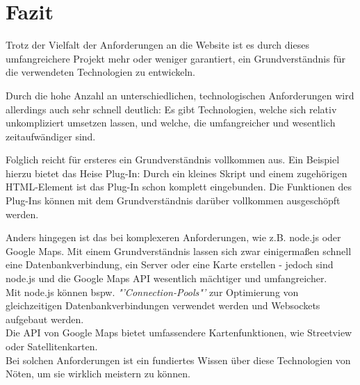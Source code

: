 \chapter{Fazit}
\label{Fazit}
Trotz der Vielfalt der Anforderungen an die Website ist es durch dieses umfangreichere Projekt mehr oder weniger garantiert, ein Grundverständnis für die verwendeten Technologien zu entwickeln. 
\par
Durch die hohe Anzahl an unterschiedlichen, technologischen Anforderungen wird allerdings auch sehr schnell deutlich: Es gibt Technologien, welche sich relativ unkompliziert umsetzen lassen, und welche, die umfangreicher und wesentlich zeitaufwändiger sind. 
\par
Folglich reicht für ersteres ein Grundverständnis vollkommen aus. Ein Beispiel hierzu bietet das Heise Plug-In: Durch ein kleines Skript und einem zugehörigen HTML-Element ist das Plug-In schon komplett eingebunden. Die Funktionen des Plug-Ins können mit dem Grundverständnis darüber vollkommen ausgeschöpft werden.
\par
Anders hingegen ist das bei komplexeren Anforderungen, wie z.B. node.js oder Google Maps. Mit einem Grundverständnis lassen sich zwar einigermaßen schnell eine Datenbankverbindung, ein Server oder eine Karte erstellen - jedoch sind node.js und die Google Maps API wesentlich mächtiger und umfangreicher. 
\\
Mit node.js können bspw. \textit{"'Connection-Pools"'} zur Optimierung von gleichzeitigen Datenbankverbindungen verwendet werden und Websockets aufgebaut werden. 
\\
Die API von Google Maps bietet umfassendere Kartenfunktionen, wie Streetview oder Satellitenkarten.
\\
Bei solchen Anforderungen ist ein fundiertes Wissen über diese Technologien von Nöten, um sie wirklich meistern zu können.
